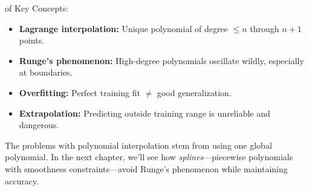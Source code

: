  of Key Concepts:
\begin{itemize}
    \item \textbf{Lagrange interpolation:} Unique polynomial of degree $\leq n$ through $n+1$ points.
    \item \textbf{Runge's phenomenon:} High-degree polynomials oscillate wildly, especially at boundaries.
    \item \textbf{Overfitting:} Perfect training fit $\neq$ good generalization.
    \item \textbf{Extrapolation:} Predicting outside training range is unreliable and dangerous.
\end{itemize}



 The problems with polynomial interpolation stem from using one global polynomial. In the next chapter, we'll see how \emph{splines}---piecewise polynomials with smoothness constraints---avoid Runge's phenomenon while maintaining accuracy.



